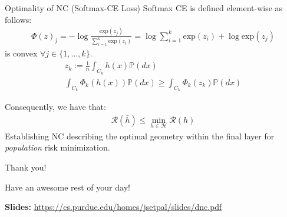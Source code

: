 \documentclass{beamer}
\begin{document}
\begin{frame}{Optimality of NC (Softmax-CE Loss)}
	Softmax CE is defined element-wise as follows:
	\begin{gather}
		\Phi(z)_j = -\log \frac{\text{exp}(z_j)}{\sum^k_{i=1}\text{exp}(z_i)} = \log \sum^k_{i=1}\text{exp}(z_i) + \log \text{exp}(z_j)
	\end{gather}
	is convex $\forall j \in \{1, \ldots, k\}$. \pause
	\begin{gather}
		z_k := \frac{1}{n} \int_{C_k} h(x) \mathbb{P}(dx) \\
		\int_{C_k} \Phi_k(h(x)) \mathbb{P}(dx) \geq
		\int_{C_k} \Phi_k(z_k) \mathbb{P}(dx)
	\end{gather} \pause
	
	Consequently, we have that:
	\begin{gather}
		\mathcal{R}(\bar{h}) \leq \min_{h \in \mathcal{H}} \mathcal{R}(h)
	\end{gather}
	Establishing NC describing the optimal geometry within the final layer for \textit{population} risk minimization.
\end{frame}

\begin{frame}{Thank you!}
	\begin{center}
		Have an awesome rest of your day!
	\end{center}
	\begin{center}
		\textbf{Slides:} \url{https://cs.purdue.edu/homes/jsetpal/slides/dnc.pdf}
	\end{center}
\end{frame}
\end{document}
